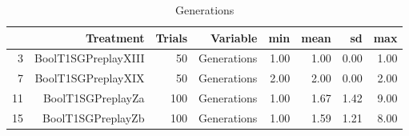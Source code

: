 \begin{table}[ht]
\centering
\begin{tabular}{rrrrrrrr}
  \hline
 & Treatment & Trials & Variable & min & mean & sd & max \\ 
  \hline
3 & BoolT1SGPreplayXIII &  50 & Generations & 1.00 & 1.00 & 0.00 & 1.00 \\ 
  7 & BoolT1SGPreplayXIX &  50 & Generations & 2.00 & 2.00 & 0.00 & 2.00 \\ 
  11 & BoolT1SGPreplayZa & 100 & Generations & 1.00 & 1.67 & 1.42 & 9.00 \\ 
  15 & BoolT1SGPreplayZb & 100 & Generations & 1.00 & 1.59 & 1.21 & 8.00 \\ 
   \hline
\end{tabular}
\caption{Generations} 
\end{table}
